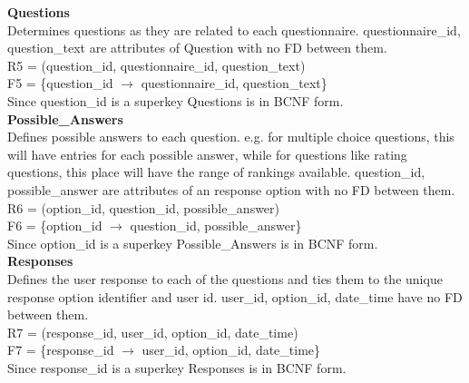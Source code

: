 \documentclass[12pt, oneside, a4paper]{article}
\newcommand{\tb}[1]{\textbf{#1}}
\begin{document}
    \tb{Questions} \\
    Determines questions as they are related to each questionnaire. questionnaire\_id, question\_text are attributes of Question with no FD between them. \\
    R5 = (question\_id, questionnaire\_id, question\_text) \\
    F5 = \{question\_id \(\rightarrow\) questionnaire\_id, question\_text\} \\
    Since question\_id is a superkey Questions is in BCNF form. 
    \\

    \tb{Possible\_Answers} \\
    Defines possible answers to each question. e.g. for multiple choice questions, this will have entries for each possible answer, while for questions like rating questions, this place will have the range of rankings available. question\_id, possible\_answer are attributes of an response option with no FD between them. \\
    R6 = (option\_id, question\_id, possible\_answer) \\
    F6 = \{option\_id \(\rightarrow\) question\_id, possible\_answer\} \\
    Since option\_id is a superkey Possible\_Answers is in BCNF form. 
    \\

    \tb{Responses} \\
    Defines the user response to each of the questions and ties them to the unique response option identifier and user id. user\_id, option\_id, date\_time have no FD between them. \\
    R7 = (response\_id, user\_id, option\_id, date\_time) \\
    F7 = \{response\_id $\rightarrow$ user\_id, option\_id, date\_time\} \\
    Since response\_id is a superkey Responses is in BCNF form. 
    \\
\end{document}
